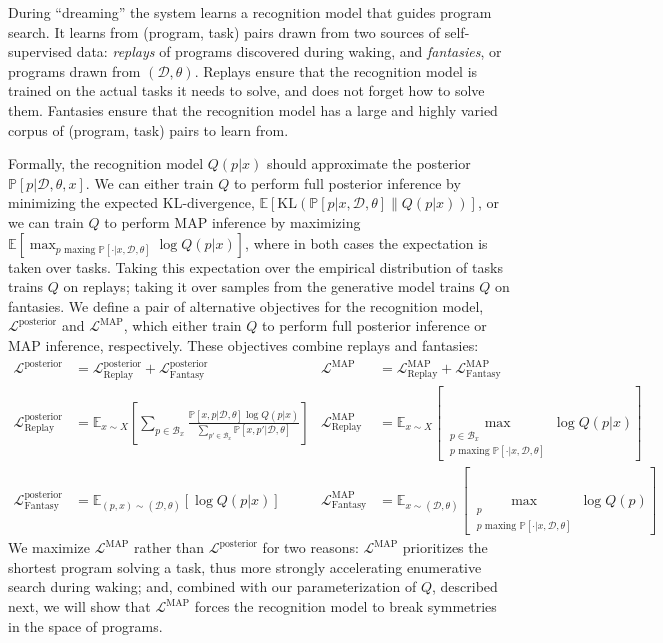 \documentclass{article}
\newcommand{\expect}{\mathds{E}} %
\newcommand{\probability}{\mathds{P}} %
\begin{document}
During ``dreaming'' the system learns a recognition model that guides
program search.  It learns from (program, task) pairs drawn from two
sources of self-supervised data: \emph{replays} of programs discovered
during waking, and \emph{fantasies}, or programs drawn from $(\mathcal{D},\theta)$.
Replays ensure that the recognition model is trained on the actual
tasks it needs to solve, and does not forget how to solve them.
Fantasies ensure that the recognition model has a large and highly
varied corpus of (program, task) pairs to learn from.

Formally, the recognition model $Q(p|x)$ should approximate the posterior
$\probability[p|\mathcal{D},\theta,x]$.
We can either train $Q$ to perform full posterior inference by minimizing the expected KL-divergence, $  \expect\left[\text{KL}\left(\probability[p|x,\mathcal{D},\theta]\|Q(p|x) \right) \right]$,
or we can train $Q$ to perform MAP inference
by maximizing $\expect\left[\max_{p\text{ maxing }\probability[\cdot |x,\mathcal{D},\theta]} \log Q(p|x) \right]$,
where in both cases the expectation is taken over tasks. Taking this expectation over the empirical distribution of tasks trains $Q$ on replays; taking it over samples from the generative model trains $Q$ on fantasies.
We define a pair of alternative objectives for the recognition model,
$\mathcal{L}^{\text{posterior}}$ and $\mathcal{L}^{\text{MAP}}$,
which either train $Q$ to perform full posterior inference or MAP inference, respectively.
These objectives combine replays and fantasies:
\begin{align*}
  \mathcal{L}^{\text{posterior}} &= \mathcal{L}_{\text{Replay}}^{\text{posterior}} + \mathcal{L}_{\text{Fantasy}}^{\text{posterior}}&
  \mathcal{L}^{\text{MAP}} &= \mathcal{L}_{\text{Replay}}^{\text{MAP}} + \mathcal{L}_{\text{Fantasy}}^{\text{MAP}}\\
  \mathcal{L}_{\text{Replay}}^{\text{posterior}}& = \expect_{x\sim X}\left[\sum_{p\in \mathcal{B}_x}
    \frac{\probability\left[x,p|\mathcal{D},\theta \right]\log Q(p|x)}{\sum_{p'\in \mathcal{B}_x}\probability\left[x,p'|\mathcal{D},\theta \right]}\right] &
  \mathcal{L}_{\text{Replay}}^{\text{MAP}}& = \expect_{x\sim X}\left[\max_{\substack{p\in \mathcal{B}_x\\p\text{ maxing }\probability[\cdot |x,\mathcal{D},\theta]}} \log Q(p|x) \right]  \\
  \mathcal{L}_{\text{Fantasy}}^{\text{posterior}} &= \expect_{(p,x)\sim(\mathcal{D},\theta) }\left[\log Q(p|x)\right]&
  \mathcal{L}_{\text{Fantasy}}^{\text{MAP}} &= \expect_{x\sim(\mathcal{D},\theta) }\left[\max_{\substack{p\\p\text{ maxing }\probability[\cdot |x,\mathcal{D},\theta]}}\log Q(p)\right]
\end{align*}
We maximize $\mathcal{L}^{\text{MAP}}$ rather than
$\mathcal{L}^{\text{posterior}}$ for two reasons:
$\mathcal{L}^{\text{MAP}}$ prioritizes the shortest program solving a
task, thus more strongly accelerating enumerative search during waking;
and, combined with our parameterization of $Q$, described next, we
will show that $\mathcal{L}^{\text{MAP}}$ forces the recognition model
to break symmetries in the space of programs.
\end{document}
